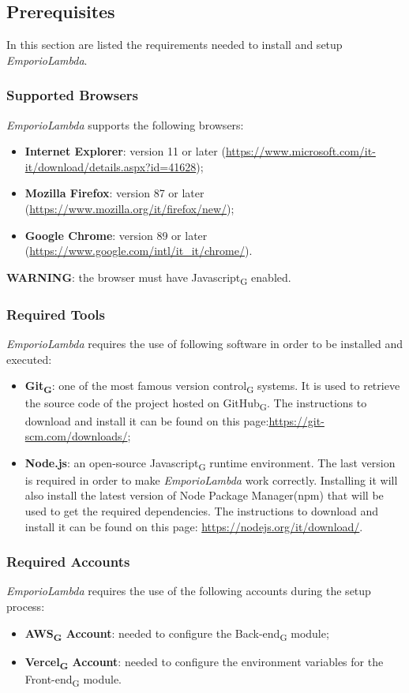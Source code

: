 \subsection{Prerequisites}
In this section are listed the requirements needed to install and setup \textit{EmporioLambda}.

\subsubsection{Supported Browsers}
\textit{EmporioLambda} supports the following browsers:
\begin{itemize}
\item \textbf{Internet Explorer}: version 11 or later (\url{https://www.microsoft.com/it-it/download/details.aspx?id=41628});
\item \textbf{Mozilla Firefox}: version 87 or later (\url{https://www.mozilla.org/it/firefox/new/});
\item \textbf{Google Chrome}: version 89 or later (\url{https://www.google.com/intl/it_it/chrome/}).
\end{itemize}
\textbf{WARNING}: the browser must have Javascript\textsubscript{G} enabled.

\subsubsection{Required Tools}
\textit{EmporioLambda} requires the use of following software in order to be installed and executed:
\begin{itemize}
\item \textbf{Git\textsubscript{G}}: one of the most famous version control\textsubscript{G} systems. It is used to retrieve the source code of the project hosted on GitHub\textsubscript{G}. The instructions to download and install it can be found on this page:\url{https://git-scm.com/downloads/};
\item \textbf{Node.js}: an open-source Javascript\textsubscript{G} runtime environment. The last version is required in order to make \textit{EmporioLambda} work correctly. Installing it will also install the latest version of Node Package Manager(npm) that will be used to get the required dependencies. The instructions to download and install it can be found on this page: \url{https://nodejs.org/it/download/}.
\end{itemize}

\subsubsection{Required Accounts}
\textit{EmporioLambda} requires the use of the following accounts during the setup process:
\begin{itemize}
\item \textbf{AWS\textsubscript{G} Account}: needed to configure the Back-end\textsubscript{G} module;
\item \textbf{Vercel\textsubscript{G} Account}: needed to configure the environment variables for the Front-end\textsubscript{G} module.
\end{itemize}

